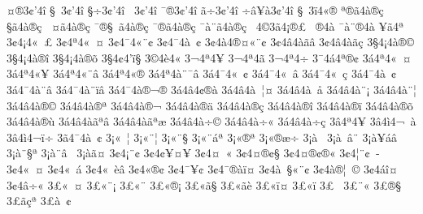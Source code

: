 {^^a4^^ae3^^a2'4^^ee
^^a7^^a03^^a2'4^^ee
^^a7^^f73^^a2'4^^ee
^^ad^^a03^^a2'4^^ee
^^af^^ae3^^a2'4^^ee
^^e3^^f73^^a2'4^^ee
^^f7^^ad^^e2^^a5^^e03^^a2'4^^ee
^^a7^^a03^^ef4^^ab^^ae
^^aa^^ae^^e34^^e0^^ae^^e7
^^a7^^e34^^e0^^ae^^e7
^^ad^^a0^^a4^^e34^^e0^^ae^^e7
^^af^^ae^^a7^^a0^^e34^^e0^^ae^^e7
^^af^^ae^^e34^^e0^^ae^^e7
^^af^^e0^^a8^^e34^^e0^^ae^^e7
^^ad^^a04^^a93^^e34^^a1^^ae^^a3
^^ad^^a0^^ae4^^e0
^^af^^e0^^a8^^ae4^^e0
^^ad^^a5^^e34^^aa
3^^a24^^a14^^ab^^a0^^a3
3^^a24^^aa4^^ab^^a0^^a4
3^^a24^^af4^^ab^^a8^^a2
3^^a24^^af4^^e0^^a0^^a2^^ad
3^^a24^^e04^^ae^^a4^^ab^^a8^^a2
3^^a24^^e24^^e0^^e3^^e2
3^^a24^^e24^^e0^^e3^^e7
3^^a74^^a14^^e0^^ae^^a9
3^^a74^^a14^^e0^^ae^^ee
3^^a74^^a14^^e0^^ae^^f5
3^^a74^^a24'^^ef^^a7
3^^a94^^e84^^ab
3^^ac4^^aa4^^ad^^a5
3^^ac4^^aa4^^ad^^e3
3^^ac4^^aa4^^ad^^f7
3^^af4^^e14^^aa^^ae^^a2
3^^e14^^aa4^^ab^^a0^^a4
3^^e14^^aa4^^ab^^a5
3^^e14^^aa4^^ab^^a8^^e2
3^^e14^^aa4^^ab^^ae
3^^e14^^aa4^^e0^^a8^^af^^e2
3^^e14^^af4^^ab^^a0^^a2
3^^e14^^af4^^ab^^a0^^e2
3^^e14^^af4^^ab^^a0^^e7
3^^e14^^af4^^e0^^a0^^a2
3^^e14^^af4^^e0^^a8^^e2^^ad
3^^e14^^af4^^e0^^a8^^ef^^e2
3^^e14^^af4^^e0^^ae^^ac^^ae
3^^e14^^e24^^a2^^ae^^e0
3^^e14^^e24^^e0^^a0^^a6^^a4
3^^e14^^e24^^e0^^a0^^e5
3^^e14^^e24^^e0^^a8^^a1
3^^e14^^e24^^e0^^a8^^a6
3^^e14^^e24^^e0^^ae^^a9
3^^e14^^e24^^e0^^ae^^aa
3^^e14^^e24^^e0^^ae^^ac
3^^e14^^e24^^e0^^ae^^e4
3^^e14^^e24^^e0^^ae^^e7
3^^e14^^e24^^e0^^ae^^ee
3^^e14^^e24^^e0^^ae^^ef
3^^e14^^e24^^e0^^ae^^f5
3^^e14^^e24^^e0^^ae^^f9
3^^e14^^e24^^e0^^e3^^aa^^e2
3^^e14^^e24^^e0^^e3^^aa^^e6
3^^e14^^e24^^e0^^f7^^a9
3^^e14^^e24^^e0^^f7^^ab
3^^e14^^e24^^e0^^f7^^e7
3^^e24^^aa4^^ad^^a5^^ad
3^^e24^^ec4^^ac^^a0^^e0
3^^e24^^ec4^^ac^^ef^^ad^^f7
3^^e34^^af4^^e0^^a0^^a2
3^^a1^^ab^^a0^^a6
3^^a1^^ab^^a8^^a6
3^^a1^^ab^^a8^^a7
3^^a1^^ab^^a8^^e1^^aa
3^^a1^^ab^^ae^^aa
3^^a1^^ab^^ae^^e6^^f7
3^^a1^^e0^^a0^^ad
3^^a1^^e0^^a0^^e2^^a8
3^^a1^^e0^^a5^^e1^^e2
3^^a1^^e0^^a8^^a7^^aa
3^^a1^^e0^^a8^^e2^^a0^^ad
3^^a1^^e0^^e3^^a4
3^^a24^^a1^^a8^^a2
3^^a24^^a2^^a5^^a4^^a5^^ad
3^^a24^^a4^^a0^^ab
3^^a24^^a4^^ae^^a2^^a7
3^^a24^^a4^^ae^^a2^^ae^^ab
3^^a24^^a6^^a8^^a2^^a0^^ad
3^^a24^^ab^^a0^^a4
3^^a24^^ab^^a0^^e1^^ad
3^^a24^^ab^^a0^^e8^^e2
3^^a24^^ab^^ae^^a2   
3^^a24^^af^^a5^^a2^^ad
3^^a24^^af^^ae^^e0^^ef^^a4
3^^a24^^e0^^a0^^a7^^ab^^a8^^a2
3^^a24^^e0^^ae^^a6^^a0^^a9
3^^a24^^e1^^ee^^a4
3^^a24^^e2^^f7^^ab
3^^a3^^ab^^a0^^a4
3^^a3^^ab^^a8^^a1
3^^a3^^ab^^a8^^ad
3^^a3^^ab^^ae^^a1
3^^a3^^ab^^e3^^a7
3^^a3^^ab^^e3^^e8
3^^a3^^ab^^ef^^a4
3^^a3^^ab^^ef^^ad
3^^a3^^ad^^a0^^ad
3^^a3^^ad^^a8^^ab
3^^a3^^ad^^ae^^a7
3^^a3^^ad^^e3^^e7^^aa
3^^a3^^e0^^a0^^a2
}
